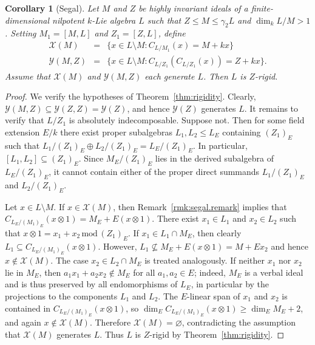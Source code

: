 \documentclass[11pt,a4paper]{amsart}
\theoremstyle{plain}
\newtheorem{cor}[thm]{Corollary}
\theoremstyle{remark}
\newcommand{\tensor}{\otimes}
\begin{document}
\begin{cor}[Segal] \label{cor:segal}
Let $M$ and $Z$ be highly invariant ideals of a finite-dimensional nilpotent $k$-Lie algebra $L$ such that $Z \leq M \leq \gamma_2 L$ and $\dim_k L/M > 1$.  Setting $M_1 = [M,L]$ and $Z_1 = [Z,L]$, define
\begin{eqnarray*}
\mathcal{X}(M) & = & \{ x \in L \setminus M : C_{L / M_1}(x) = M + kx \} \\
\mathcal{Y}(M,Z) & = & \{ x \in L \setminus M : C_{L / Z_1}(C_{L/Z_1}(x)) = Z + kx \}.
\end{eqnarray*}
Assume that $\mathcal{X}(M)$ and $\mathcal{Y}(M,Z)$ each generate $L$.  Then $L$ is $Z$-rigid.
\end{cor}
\begin{proof}
We verify the hypotheses of Theorem~\ref{thm:rigidity}.  Clearly, $\mathcal{Y}(M,Z) \subseteq \mathcal{Y}(Z,Z) = \mathcal{Y}(Z)$, and hence $\mathcal{Y}(Z)$ generates $L$.  It remains to verify that $L / Z_1$ is absolutely indecomposable.  Suppose not.  Then for some field extension $E/k$ there exist proper subalgebras $L_1, L_2 \leq L_E$ containing $(Z_1)_E$ such that $L_1 / (Z_1)_E \oplus L_2 / (Z_1)_E = L_E / (Z_1)_E$.  In particular, $[L_1, L_2] \subseteq (Z_1)_E$.  Since $M_E/(Z_1)_E$ lies in the derived subalgebra of $L_E/(Z_1)_E$, it cannot contain either of the proper direct summands $L_1 / (Z_1)_E$ and $L_2 / (Z_1)_E$.  

Let $x \in L \setminus M$.  If $x \in \mathcal{X}(M)$, then Remark~\ref{rmk:segal.remark} implies that $C_{L_E / (M_1)_E}(x \tensor 1) = M_E + E(x \tensor 1)$.  There exist $x_1 \in L_1$ and $x_2 \in L_2$ such that $x \tensor 1 = x_1 + x_2 \, \mathrm{mod} \, (Z_1)_E$.  
If $x_1 \in L_1 \cap M_E$, then clearly $L_1 \subseteq C_{L_E/(M_1)_E} (x \tensor 1)$.  However, $L_1 \not\subseteq M_E + E(x \tensor 1) = M + Ex_2$ and hence $x \not\in \mathcal{X}(M)$.  The case $x_2 \in L_2 \cap M_E$ is treated analogously.  If neither $x_1$ nor $x_2$ lie in $M_E$, then $a_1 x_1 + a_2 x_2 \not\in M_E$ for all $a_1, a_2 \in E$; indeed, $M_E$ is a verbal ideal and is thus preserved by all endomorphisms of $L_E$, in particular by the projections to the components $L_1$ and $L_2$.  The $E$-linear span of $x_1$ and $x_2$ is contained in $C_{L_E/(M_1)_E} (x \tensor 1)$, so $\dim_E C_{L_E/(M_1)_E}(x \tensor 1) \geq \dim_E M_E + 2$, and again $x \not\in \mathcal{X}(M)$.  Therefore $\mathcal{X}(M) = \varnothing$, contradicting the assumption that $\mathcal{X}(M)$ generates $L$.  Thus $L$ is $Z$-rigid by Theorem~\ref{thm:rigidity}.
\end{proof}
\end{document}
